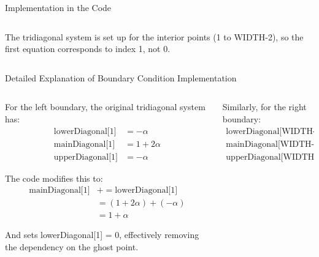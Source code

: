 \documentclass{beamer}
\begin{document}
\begin{frame}[fragile]{Implementation in the Code}
\begin{columns}
\begin{column}{0.5\textwidth}
            
            The tridiagonal system is set up for the interior points (1 to WIDTH-2), so the first equation corresponds to index 1, not 0.
        \end{column}
    \end{columns}
\end{frame}

\begin{frame}{Detailed Explanation of Boundary Condition Implementation}
    \vspace{-0.5cm}
    
    \begin{columns}
        \begin{column}{0.5\textwidth}
            \small
            For the left boundary, the original tridiagonal system has:
            \begin{align*}
                \text{lowerDiagonal[1]} &= -\alpha\\
                \text{mainDiagonal[1]} &= 1 + 2\alpha\\
                \text{upperDiagonal[1]} &= -\alpha
            \end{align*}
            
            The code modifies this to:
            \begin{align*}
                \text{mainDiagonal[1]} &+= \text{lowerDiagonal[1]}\\
                &= (1 + 2\alpha) + (-\alpha)\\
                &= 1 + \alpha
            \end{align*}
            
            And sets lowerDiagonal[1] = 0, effectively removing the dependency on the ghost point.
        \end{column}
        
        \begin{column}{0.5\textwidth}
            \small
            Similarly, for the right boundary:
            \begin{align*}
                \text{lowerDiagonal[WIDTH-2]} &= -\alpha\\
                \text{mainDiagonal[WIDTH-2]} &= 1 + 2\alpha\\
                \text{upperDiagonal[WIDTH-2]} &= -\alpha
            \end{align*}
            

\end{column}
\end{columns}
\end{frame}
\end{document}
